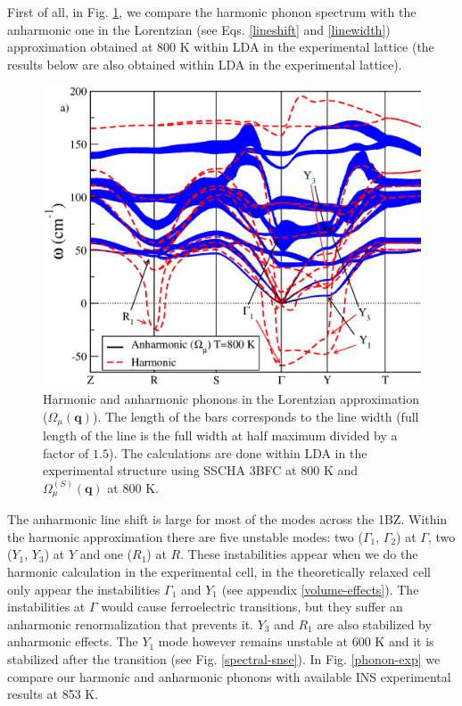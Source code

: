 First of all, in Fig. \ref{spectrum-phonon-snse}, we compare the harmonic phonon spectrum with the anharmonic one in the Lorentzian (see Eqs. \ref{lineshift} and \ref{linewidth}) approximation obtained at $800$ K within LDA in 
the experimental lattice (the results below are also obtained within LDA in the experimental lattice).
\begin{figure}[h]
\includegraphics[width=\linewidth]{Figures/spectrum-snse.eps}
\caption[Phonons in the Lorentzian approximation in SnSe.]{Harmonic and anharmonic phonons in the Lorentzian approximation ($\Omega_{\mu}(\mathbf{q})$). The length of the bars corresponds to the line width (full length of the line 
is the full width at half maximum divided by a factor of $1.5$). The calculations are done within LDA in the experimental structure using SSCHA 3BFC at $800$ K and $\Omega^{(S)}_{\mu}(\mathbf{q})$ at $800$ K.}
\label{spectrum-phonon-snse}
\end{figure}
The anharmonic line shift is large for most of the modes across the 1BZ. Within the harmonic approximation there are five unstable modes: two ($\Gamma_{1}$, $\Gamma_{2}$) at $\Gamma$, two ($Y_{1}$, $Y_{3}$) at $Y$ and one 
($R_{1}$) at $R$. These instabilities appear when we do the harmonic calculation in the experimental cell, in the theoretically relaxed cell only appear the instabilities $\Gamma_{1}$ and $Y_{1}$ (see appendix \ref{volume-effects}). The instabilities at $\Gamma$ would cause ferroelectric transitions\cite{skelton2016anharmonicity,hong2016electronic}, but they suffer an anharmonic renormalization that prevents it. $Y_{3}$ and $R_{1}$ are also stabilized by anharmonic effects. The $Y_{1}$ mode however remains unstable at $600$ K and it is stabilized after the transition (see Fig. \ref{spectral-snse}). In Fig. \ref{phonon-exp} we compare our harmonic and anharmonic phonons with available INS experimental results\cite{chatterji2018soft} at 853 K. 
